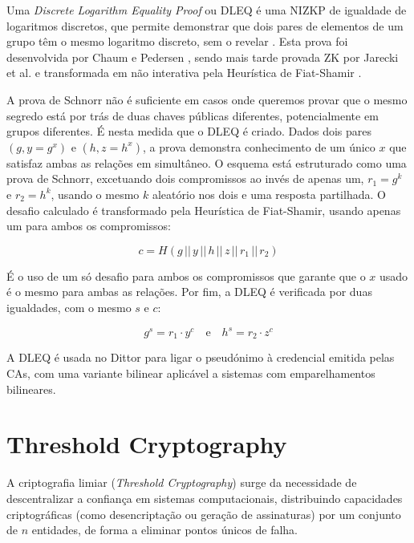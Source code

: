 Uma \textit{Discrete Logarithm Equality Proof} ou DLEQ é uma NIZKP de igualdade de logaritmos discretos, que permite demonstrar que dois pares de elementos de um grupo têm o mesmo logaritmo discreto, sem o revelar \cite{rfc9497}. Esta prova foi desenvolvida por Chaum e Pedersen \cite{chaumpedersen1992wallet}, sendo mais tarde provada ZK por Jarecki et al. \cite{jarecki2014roundoptimal} e transformada em não interativa pela Heurística de Fiat-Shamir \cite{fiatshamir1986how}.

A prova de Schnorr não é suficiente em casos onde queremos provar que o mesmo segredo está por trás de duas chaves públicas diferentes, potencialmente em grupos diferentes. É nesta medida que o DLEQ é criado. Dados dois pares $(g, y = g^x)$ e $(h, z = h^x)$, a prova demonstra conhecimento de um único $x$ que satisfaz ambas as relações em simultâneo. O esquema está estruturado como uma prova de Schnorr, excetuando dois compromissos ao invés de apenas um, $r_1 = g^k$ e $r_2 = h^k$, usando o mesmo $k$ aleatório nos dois e uma resposta partilhada. O desafio calculado é transformado pela Heurística de Fiat-Shamir, usando apenas um para ambos os compromissos:

\begin{equation*}
    c = H(g \, || \, y \, || \, h \, || \, z \, || \, r_1 \, || \, r_2)
\end{equation*}

É o uso de um só desafio para ambos os compromissos que garante que o $x$ usado é o mesmo para ambas as relações. Por fim, a DLEQ é verificada por duas igualdades, com o mesmo $s$ e $c$:

\begin{equation*}
    g^s = r_1 \cdot y^c \quad \text{e} \quad h^s = r_2 \cdot z^c
\end{equation*}

A DLEQ é usada no Dittor para ligar o pseudónimo à credencial emitida pelas CAs, com uma variante bilinear aplicável a sistemas com emparelhamentos bilineares.

\section{Threshold Cryptography}
\label{sec:threshold_cryptography}

A criptografia limiar (\textit{Threshold Cryptography}) surge da necessidade de descentralizar a confiança em sistemas computacionais, distribuindo capacidades criptográficas (como desencriptação ou geração de assinaturas) por um conjunto de $n$ entidades, de forma a eliminar pontos únicos de falha.

